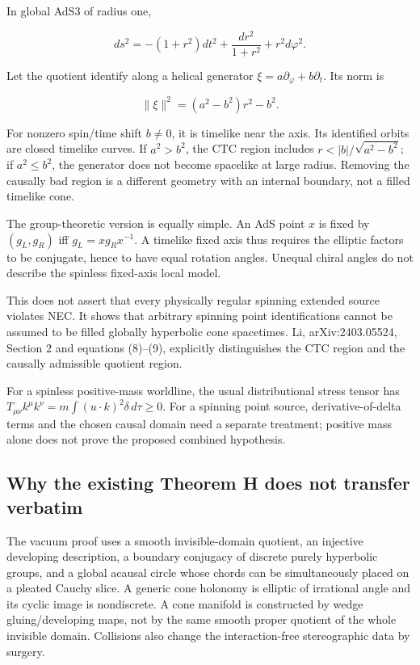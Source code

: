 \documentclass[11pt]{article}
\begin{document}
In global AdS3 of radius one,

\[
 ds^2=-(1+r^2)dt^2+\frac{dr^2}{1+r^2}+r^2d\varphi^2.
\]

Let the quotient identify along a helical generator
\(\xi=a\partial_\varphi+b\partial_t\). Its norm is

\[
 \|\xi\|^2=(a^2-b^2)r^2-b^2.
\]

For nonzero spin/time shift \(b\ne0\), it is timelike near the axis. Its
identified orbits are closed timelike curves. If \(a^2>b^2\), the CTC
region includes \(r<|b|/\sqrt{a^2-b^2}\); if \(a^2\le b^2\), the
generator does not become spacelike at large radius. Removing the
causally bad region is a different geometry with an internal boundary,
not a filled timelike cone.

The group-theoretic version is equally simple. An AdS point \(x\) is
fixed by \((g_L,g_R)\) iff \(g_L=xg_Rx^{-1}\). A timelike fixed axis
thus requires the elliptic factors to be conjugate, hence to have equal
rotation angles. Unequal chiral angles do not describe the spinless
fixed-axis local model.

This does not assert that every physically regular spinning extended
source violates NEC. It shows that arbitrary spinning point
identifications cannot be assumed to be filled globally hyperbolic cone
spacetimes. Li, arXiv:2403.05524, Section 2 and equations (8)--(9),
explicitly distinguishes the CTC region and the causally admissible
quotient region.

For a spinless positive-mass worldline, the usual distributional stress
tensor has \(T_{\mu\nu}k^\mu k^\nu=m\int(u\cdot k)^2\delta\,d\tau\ge0\).
For a spinning point source, derivative-of-delta terms and the chosen
causal domain need a separate treatment; positive mass alone does not
prove the proposed combined hypothesis.

\subsection{Why the existing Theorem H does not transfer
verbatim}\label{why-the-existing-theorem-h-does-not-transfer-verbatim}

The vacuum proof uses a smooth invisible-domain quotient, an injective
developing description, a boundary conjugacy of discrete purely
hyperbolic groups, and a global acausal circle whose chords can be
simultaneously placed on a pleated Cauchy slice. A generic cone holonomy
is elliptic of irrational angle and its cyclic image is nondiscrete. A
cone manifold is constructed by wedge gluing/developing maps, not by the
same smooth proper quotient of the whole invisible domain. Collisions
also change the interaction-free stereographic data by surgery.
\end{document}
